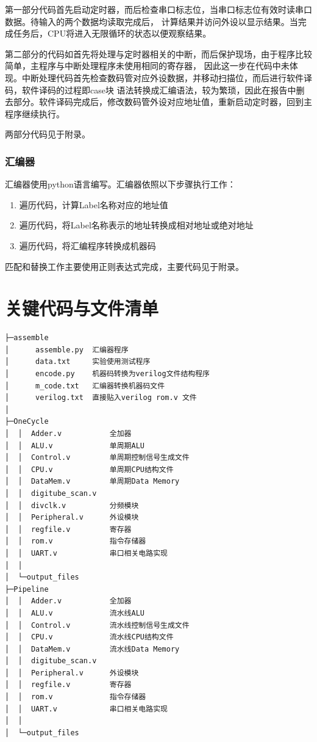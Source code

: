 \documentclass{ctexart}
\begin{document}
			第一部分代码首先启动定时器，而后检查串口标志位，当串口标志位有效时读串口数据。待输入的两个数据均读取完成后，
			计算结果并访问外设以显示结果。当完成任务后，CPU将进入无限循环的状态以便观察结果。

			第二部分的代码如首先将处理与定时器相关的中断，而后保护现场，由于程序比较简单，主程序与中断处理程序未使用相同的寄存器，
			因此这一步在代码中未体现。中断处理代码首先检查数码管对应外设数据，并移动扫描位，而后进行软件译码，软件译码的过程即case块
			语法转换成汇编语法，较为繁琐，因此在报告中删去部分。软件译码完成后，修改数码管外设对应地址值，重新启动定时器，回到主程序继续执行。

			两部分代码见于附录。


		\subsubsection{汇编器}
			汇编器使用python语言编写。汇编器依照以下步骤执行工作：
			\begin{enumerate}
				\item 遍历代码，计算Label名称对应的地址值
				\item 遍历代码，将Label名称表示的地址转换成相对地址或绝对地址
				\item 遍历代码，将汇编程序转换成机器码
			\end{enumerate}
			匹配和替换工作主要使用正则表达式完成，主要代码见于附录。

	\section{关键代码与文件清单}
\begin{verbatim}
├─assemble
│      assemble.py  汇编器程序
│      data.txt		实验使用测试程序
│      encode.py	机器码转换为verilog文件结构程序
│      m_code.txt	汇编器转换机器码文件
│      verilog.txt	直接贴入verilog rom.v 文件
│
├─OneCycle
│  │  Adder.v			全加器
│  │  ALU.v				单周期ALU
│  │  Control.v			单周期控制信号生成文件
│  │  CPU.v				单周期CPU结构文件
│  │  DataMem.v			单周期Data Memory
│  │  digitube_scan.v	
│  │  divclk.v			分频模块
│  │  Peripheral.v		外设模块
│  │  regfile.v			寄存器
│  │  rom.v				指令存储器
│  │  UART.v			串口相关电路实现
│  │
│  └─output_files
├─Pipeline
│  │  Adder.v			全加器
│  │  ALU.v				流水线ALU
│  │  Control.v			流水线控制信号生成文件
│  │  CPU.v				流水线CPU结构文件
│  │  DataMem.v			流水线Data Memory
│  │  digitube_scan.v	
│  │  Peripheral.v		外设模块
│  │  regfile.v			寄存器
│  │  rom.v				指令存储器
│  │  UART.v			串口相关电路实现
│  │
│  └─output_files
\end{verbatim}
\end{document}
